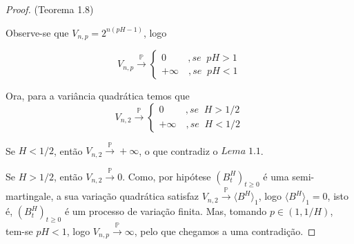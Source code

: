 \documentclass{article}
\begin{document}
\begin{proof}{(Teorema 1.8)}
\vspace{0.5cm}


Observe-se que $V_{n,p}=2^{n(pH-1)}$, logo

\begin{equation*}
    V_{n,p} \overset{\mathbb{P}}{\longrightarrow} 
    \begin{cases}
        0 \;\;\;\;\;\;\;\;, se\;\; pH >1\\
        +\infty\;\;\;\,, se\;\; pH<1
    \end{cases}
\end{equation*}

Ora, para a variância quadrática temos que
\begin{equation*}
    V_{n,2} \overset{\mathbb{P}}{\longrightarrow} 
    \begin{cases}
        0 \;\;\;\;\;\;\;\;, se\;\; H >1/2\\
        +\infty\;\;\;\,, se\;\; H<1/2
    \end{cases}
\end{equation*}

Se $H<1/2$, então $V_{n,2} \overset{\mathbb{P}}{\longrightarrow} +\infty$, o que contradiz o $Lema \;1.1$.

Se $H>1/2$, então $V_{n,2} \overset{\mathbb{P}}{\longrightarrow} 0$. Como, por hipótese $(B^H_t)_{t \geq 0}$ é uma semi-martingale, a sua variação quadrática satisfaz $V_{n,2} \overset{\mathbb{P}}{\longrightarrow}\langle B^H\rangle_1$, logo $\langle B^H \rangle_1=0$, isto é, $(B^H_t)_{t \geq 0}$ é um processo de variação finita. Mas, tomando $p \in (1,1/H)$, tem-se $pH<1$, logo $V_{n,p} \overset{\mathbb{P}}{\longrightarrow} \infty$, pelo que chegamos a uma contradição.

 

\end{proof}

\vspace{1cm}


\vspace{5cm}
\end{document}
